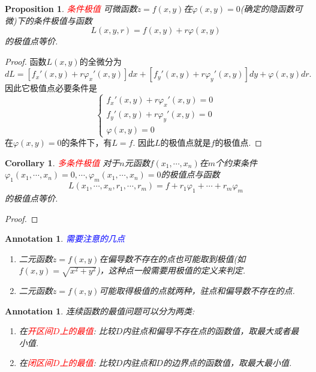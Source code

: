 \documentclass{article}
\newtheorem{corollary}[theorem]{Corollary}
\newtheorem{proposition}[theorem]{Proposition}
\newtheorem{annotation}[theorem]{Annotation}
\newcommand{\redt}[1]{\textcolor{red}{#1}}
\newcommand{\bluet}[1]{\textcolor{blue}{#1}}
\begin{document}
\begin{proposition}
\rm \redt{条件极值} 可微函数$z=f(x,y)$在$\varphi(x,y)=0$(确定的隐函数可微)下的条件极值与函数
$$
L(x,y,r) = f(x,y)+r\varphi(x,y)
$$
的极值点等价. 
\end{proposition}

\begin{proof}
\rm 函数$L(x,y)$的全微分为
$$
dL = [f_x'(x,y) + r\varphi_x'(x,y)]dx + [f_y'(x,y) + r\varphi_y'(x,y)]dy + \varphi(x,y)dr.
$$
因此它极值点必要条件是
$$
\left \{
\begin{array}{ll}
f_x'(x,y) + r\varphi_x'(x,y) = 0 \\
f_y'(x,y) + r\varphi_y'(x,y) = 0 \\
\varphi(x,y) = 0
\end{array} \right.
$$
在$\varphi(x,y)=0$的条件下，有$L=f$. 因此$L$的极值点就是$f$的极值点. 
\end{proof}

\begin{corollary}
\rm \redt{多条件极值} 对于$n$元函数$f(x_1,\cdots,x_n)$在$m$个约束条件$\varphi_1(x_1,\cdots,x_n) = 0,\cdots,\varphi_m(x_1,\cdots,x_n) = 0$的极值点与函数
$$
L(x_1,\cdots,x_n,r_1,\cdots,r_m) = f + r_1\varphi_1 + \cdots + r_m\varphi_m
$$
的极值点等价. 
\end{corollary}


\begin{proof}
\rm 
\end{proof}


\begin{annotation}
\rm \bluet{需要注意的几点}
\begin{enumerate}
	\item 二元函数$z=f(x,y)$在偏导数不存在的点也可能取到极值(如$f(x,y)=\sqrt{x^2 + y^2}$)，这种点一般需要用极值的定义来判定.
	\item 二元函数$z=f(x,y)$可能取得极值的点就两种，驻点和偏导数不存在的点.
\end{enumerate} 
\end{annotation}

\begin{annotation}
\rm 连续函数的最值问题可以分为两类:
\begin{enumerate}
	\item 在\redt{开区间$D$上的最值}: 比较$D$内驻点和偏导不存在点的函数值，取最大或者最小值.
	\item 在\redt{闭区间$D$上的最值}: 比较$D$内驻点和$D$的边界点的函数值，取最大最小值. 
\end{enumerate}
\end{annotation}
\end{document}
